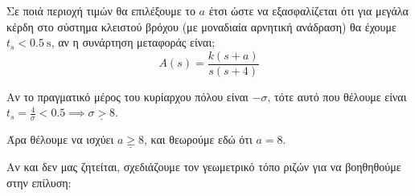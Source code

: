 \documentclass[11pt,a4paper,notitlepage,fleqn]{article}
\begin{document}
\begin{exercise}
Σε ποιά περιοχή τιμών θα επιλέξουμε το \( a \) έτσι ώστε να εξασφαλίζεται ότι για μεγάλα
κέρδη στο σύστημα κλειστού βρόχου (με μοναδιαία αρνητική ανάδραση) θα έχουμε \( t_s <
\SI{0.5}{\second} \), αν η συνάρτηση μεταφοράς είναι;
\[
A(s) = \frac{k(s+a)}{s(s+4)}
\]

\tcblower
Αν το πραγματικό μέρος του κυρίαρχου πόλου είναι \( -σ \), τότε αυτό που θέλουμε είναι \( t_s = \frac{4}{σ} < 0.5
\implies \underline{σ > 8} \).

Άρα θέλουμε να ισχύει \( \underline{a \geq 8} \), και θεωρούμε εδώ ότι \( a=8 \).

Αν και δεν μας ζητείται, σχεδιάζουμε τον γεωμετρικό τόπο ριζών για να βοηθηθούμε στην
επίλυση:

\end{exercise}
\end{document}
